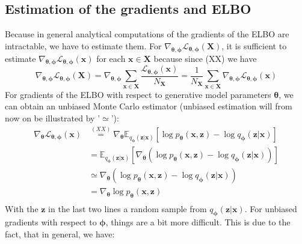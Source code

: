 \documentclass[12pt]{report}
\theoremstyle{definition}
\begin{document}
\subsection{Estimation of the gradients and ELBO}
Because in general analytical computations of the gradients of the ELBO are intractable, we have to estimate them. For $\nabla_{\pmb{\theta}, \pmb{\phi}}\mathcal{L}_{\pmb{\theta}, \pmb{\phi}}(\mathbf{X})$, it is sufficient to estimate $\nabla_{\pmb{\theta}, \pmb{\phi}}\mathcal{L}_{\pmb{\theta}, \pmb{\phi}}(\mathbf{x})$ for each $\mathbf{x} \in \mathbf{X}$ because since (XX) we have
\begin{equation}
	\nabla_{\pmb{\theta}, \pmb{\phi}}\mathcal{L}_{\pmb{\theta}, \pmb{\phi}}(\mathbf{X}) = \nabla_{\pmb{\theta}, \pmb{\phi}}  \sum_{\mathbf{x} \in \mathbf{X}} \frac{\mathcal{L}_{\mathbf{\theta}, \mathbf{\phi}}(\mathbf{x})}{N_{\mathbf{X}}} = \frac{1}{N_{\mathbf{X}}} \sum_{\mathbf{x} \in \mathbf{X}} \nabla_{\pmb{\theta}, \pmb{\phi}} \mathcal{L}_{\mathbf{\theta}, \mathbf{\phi}}(\mathbf{x})
\end{equation}
For gradients of the ELBO with respect to generative model parameters $\pmb{\theta}$, we can obtain an unbiased Monte Carlo estimator (unbiased estimation will from now on be illustrated by '$\simeq$'):
\begin{equation}
\begin{split}
\nabla_{\pmb{\theta}}\mathcal{L}_{\pmb{\theta}, \pmb{\phi}}(\mathbf{x}) 
& \stackrel{(XX)}{=} \nabla_{\pmb{\theta}} \mathbb{E}_{q_{\mathbf{\phi}}(\mathbf{z}|\mathbf{x})}\left[ \log p_{\mathbf{\theta}}(\mathbf{x}, \mathbf{z}) - \log q_{\mathbf{\phi}}(\mathbf{z}|\mathbf{x}) \right]	\\
& = \mathbb{E}_{q_{\mathbf{\phi}}(\mathbf{z}|\mathbf{x})}\left[ \nabla_{\pmb{\theta}} (\log p_{\mathbf{\theta}}(\mathbf{x}, \mathbf{z}) - \log q_{\mathbf{\phi}}(\mathbf{z}|\mathbf{x})) \right] \\
& \simeq \nabla_{\pmb{\theta}} (\log p_{\mathbf{\theta}}(\mathbf{x}, \mathbf{z}) - \log q_{\mathbf{\phi}}(\mathbf{z}|\mathbf{x})) \\
& = \nabla_{\pmb{\theta}} \log p_{\mathbf{\theta}}(\mathbf{x}, \mathbf{z})\\
\end{split}
\end{equation}
With the $\mathbf{z}$ in the last two lines a random sample from $q_{\mathbf{\phi}}(\mathbf{z}|\mathbf{x})$. For unbiased gradients with respect to $\pmb{\phi}$, things are a bit more difficult. This is due to the fact, that in general, we have:
\end{document}
